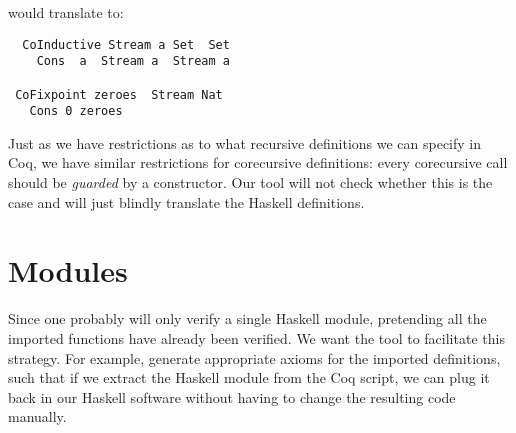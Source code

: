 \documentclass[a4paper,10pt]{article}
\begin{document}
would translate to:

\begin{tabbing}\tt
~CoInductive~Stream~a~Set~~Set~\\
\tt ~~~~Cons~~a~~Stream~a~~Stream~a\\
\tt ~\\
\tt ~CoFixpoint~zeroes~~Stream~Nat~\\
\tt ~~~Cons~0~zeroes
\end{tabbing}


Just as we have restrictions as to what recursive definitions we can
specify in Coq, we have similar restrictions for corecursive
definitions: every corecursive call should be \emph{guarded} by a
constructor. Our tool will not check whether this is the case and will
just blindly translate the Haskell definitions.


\section{Modules}

Since one probably will only verify a single Haskell module,
pretending all the imported functions have already been verified. We
want the tool to facilitate this strategy. For example, generate
appropriate axioms for the imported definitions, such that if we
extract the Haskell module from the Coq script, we can plug it back in
our Haskell software without having to change the resulting code
manually.
\end{document}
